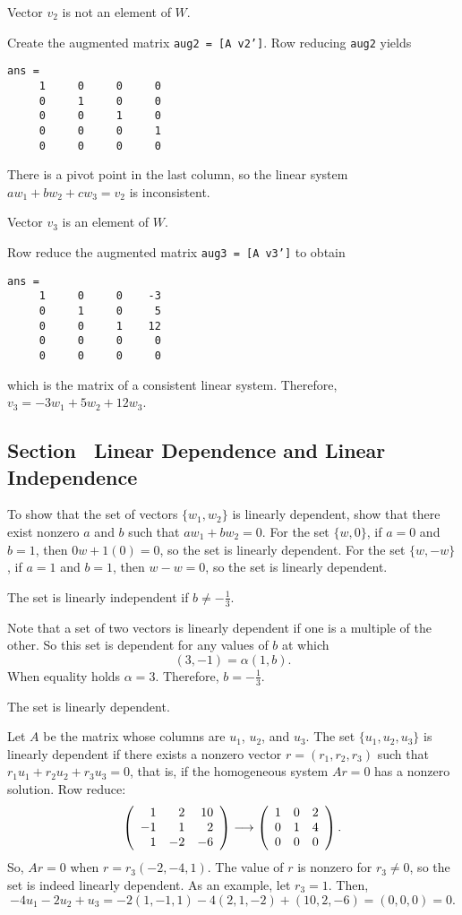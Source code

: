 \documentclass{ximera}
\begin{document}
 \ans Vector $v_2$ is not an element of $W$.

\soln Create the augmented matrix {\tt aug2 = [A v2']}.  Row reducing
{\tt aug2} yields
\begin{verbatim}
ans =
     1     0     0     0
     0     1     0     0
     0     0     1     0
     0     0     0     1
     0     0     0     0
\end{verbatim}
There is a pivot point in the last column, so the linear system
$aw_1 + bw_2 + cw_3 = v_2$ is inconsistent.

 \ans Vector $v_3$ is an element of $W$.

\soln Row reduce the augmented matrix {\tt aug3 = [A v3']} to obtain
\begin{verbatim}
ans =
     1     0     0    -3
     0     1     0     5
     0     0     1    12
     0     0     0     0
     0     0     0     0
\end{verbatim}
which is the matrix of a consistent linear system.  Therefore,
$v_3 = -3w_1 + 5w_2 + 12w_3$.


\subsection*{Section~\protect{\ref{S:5.4}} Linear Dependence and Linear
Independence}

To show that the set of vectors $\{w_1,w_2\}$ is linearly dependent,
show that there exist nonzero $a$ and $b$ such that
$aw_1 + bw_2 = 0$.  For the set $\{w,0\}$, if $a = 0$ and $b = 1$,
then $0w + 1(0) = 0$, so the set is linearly dependent.  For the
set $\{w,-w\}$, if $a = 1$ and $b = 1$, then
$w - w = 0$, so the set is linearly dependent.

\ans The set is linearly independent if $b \neq -\frac{1}{3}$.

\soln Note that a set of two vectors is linearly dependent if one is
a multiple of the other.  So this set is dependent for any values of
$b$ at which
\[
(3,-1) = \alpha(1,b).
\]
When equality holds $\alpha = 3$.  Therefore, $b = -\frac{1}{3}$.  

\ans The set is linearly dependent.

\soln Let $A$ be the matrix whose columns are $u_1$, $u_2$, and $u_3$. 
The set $\{u_1,u_2,u_3\}$ is linearly dependent if there exists
a nonzero vector $r = (r_1,r_2,r_3)$ such that $r_1u_1 + r_2u_2 +
r_3u_3 = 0$, that is, if the homogeneous system $Ar = 0$ has a
nonzero solution.  Row reduce:
\[
\left(\begin{array}{rrr} 1 & 2 & 10 \\ -1 & 1 & 2 \\ 1 & -2 & -6\end{array}\right) \longrightarrow
\left(\begin{array}{rrr} 1 & 0 & 2 \\ 0 & 1 & 4 \\ 0 & 0 & 0\end{array}\right).
\]
So, $Ar = 0$ when $r = r_3(-2,-4,1)$.
The value of $r$ is nonzero for $r_3 \neq 0$, so the set is indeed
linearly dependent.
As an example, let $r_3 = 1$.  Then,
\[
-4u_1 - 2u_2 + u_3 = -2(1,-1,1) - 4(2,1,-2) + (10,2,-6) =
(0,0,0) = 0.
\]
\end{document}
